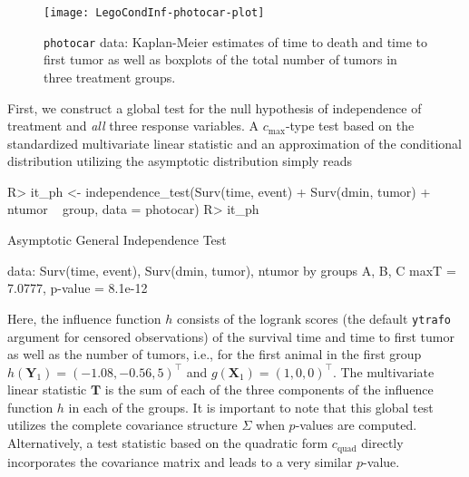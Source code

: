 \documentclass{article}
\newcommand{\Robject}[1]{\texttt{#1}}
\newcommand{\Rcmd}[1]{\texttt{#1}}
\newcommand{\X}{\mathbf{X}}
\newcommand{\Y}{\mathbf{Y}}
\newcommand{\T}{\mathbf{T}}
\newenvironment{Schunk}{}{}
\begin{document}
\begin{figure}
\begin{center}
\texttt{[image: LegoCondInf-photocar-plot]}
\caption{\Robject{photocar} data: 
         Kaplan-Meier estimates of time to death and time to first tumor as
         well as boxplots of the total number of tumors in three treatment
         groups. \label{photocarfig}}
\end{center}
\end{figure}
First, we construct a global test for the null hypothesis of independence
of treatment and \textit{all} three response variables. A
$c_\text{max}$-type test based on the standardized multivariate          
linear statistic and an approximation of the conditional distribution
utilizing the asymptotic distribution simply reads
\begin{Schunk}
\begin{Sinput}
R> it_ph <- independence_test(Surv(time, event) + 
       Surv(dmin, tumor) + ntumor ~ group, data = photocar)
R> it_ph
\end{Sinput}
\begin{Soutput}
	Asymptotic General Independence Test

data:  Surv(time, event), Surv(dmin, tumor), ntumor 
       by groups A, B, C 
maxT = 7.0777, p-value = 8.1e-12
\end{Soutput}
\end{Schunk}
Here, the influence function $h$ consists of the logrank scores 
(the default \Rcmd{ytrafo} argument for censored observations) of the survival
time and time to first tumor as well as the number of tumors, i.e., for the 
first animal in the first group $h(\Y_1) =
( -1.08,-0.56,5 )^\top$
and $g(\X_1) = (1, 0, 0)^\top$. The multivariate linear statistic $\T$ is the sum of each of
the three components of the influence function $h$ in each of the groups.
It is important to note that this global test utilizes the complete
covariance structure $\Sigma$
when $p$-values are computed.
Alternatively, a test statistic based on the quadratic form $c_\text{quad}$
directly incorporates the covariance matrix and leads to a very similar 
$p$-value. 
\end{document}
